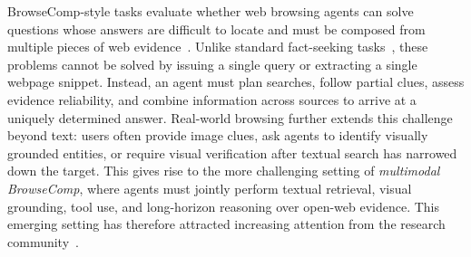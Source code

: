 \documentclass[11pt]{article}
\begin{document}

BrowseComp-style tasks evaluate whether web browsing agents can solve questions whose answers are difficult to locate and must be composed from multiple pieces of web evidence~\citep{wei2025browsecomp}. Unlike standard fact-seeking tasks~\citep{nakano2021webgpt}, these problems cannot be solved by issuing a single query or extracting a single webpage snippet. Instead, an agent must plan searches, follow partial clues, assess evidence reliability, and combine information across sources to arrive at a uniquely determined answer. Real-world browsing further extends this challenge beyond text: users often provide image clues, ask agents to identify visually grounded entities, or require visual verification after textual search has narrowed down the target. This gives rise to the more challenging setting of \emph{multimodal BrowseComp}, where agents must jointly perform textual retrieval, visual grounding, tool use, and long-horizon reasoning over open-web evidence. 
This emerging setting has therefore attracted increasing attention from the research community~\citep{jiang2024mmsearch,li2025mm}.
\end{document}

